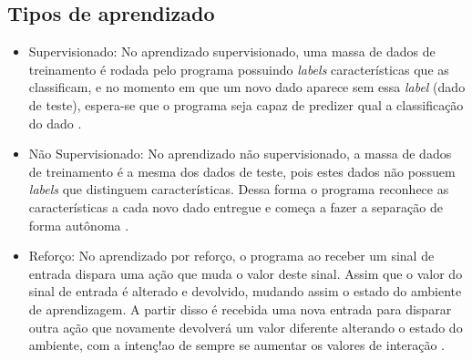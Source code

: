 \subsection{Tipos de aprendizado}
    \begin{itemize}
        \item Supervisionado: No aprendizado supervisionado, uma massa de dados de treinamento é rodada pelo programa possuindo \textit{labels} características que as classificam, e no momento em que um novo dado aparece sem essa \textit{label} (dado de teste), espera-se que o programa seja capaz de predizer qual a classificação do dado \cite{brink2015}.
        \item Não Supervisionado: No aprendizado não supervisionado, a massa de dados de treinamento é a mesma dos dados de teste, pois estes dados não possuem \textit{labels} que distinguem características. Dessa forma o programa reconhece as características a cada novo dado entregue e começa a fazer a separação de forma autônoma \cite{chao2011}.
        \item Reforço: No aprendizado por reforço, o programa ao receber um sinal de entrada dispara uma ação que muda o valor deste sinal. Assim que o valor do sinal de entrada é alterado e devolvido, mudando assim o estado do ambiente de aprendizagem. A partir disso é recebida uma nova entrada para disparar outra ação que novamente devolverá um valor diferente alterando o estado do ambiente, com a intenç!ao de sempre se aumentar os valores de interação \cite{kaelbling1996}.
    \end{itemize}



